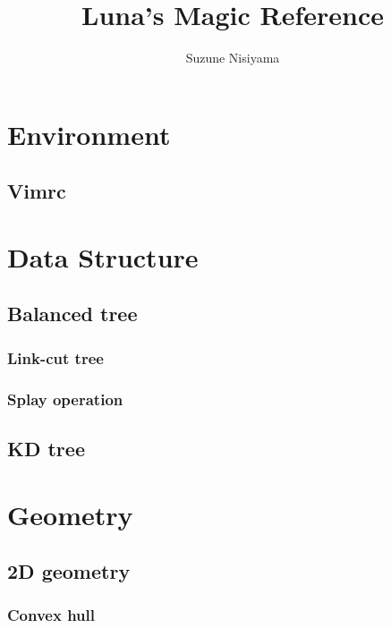 \documentclass[titlepage,a4paper,10pt]{article}
\title{Luna's Magic Reference}
\author{Suzune Nisiyama}
\date{\today\\ \vspace{100pt} \noindent\rule{\textwidth}{1pt}\\ \vspace{100pt} \normalsize\begin{raggedright}\end{raggedright}}
\begin{document}
	\maketitle
	\begin{multicols}{2}
		\setcounter{tocdepth}{3}
		\begingroup
		\let\cleardoublepage\relax
		\let\clearpage\relax
		\tableofcontents
		\newpage
		\begin{spacing}{0.8}
		{\footnotesize
		\section{Environment}
			\subsection{Vimrc}
				
		\section{Data Structure}
			\subsection{Balanced tree}
				\subsubsection{Link-cut tree}
					
				\subsubsection{Splay operation}
					
			\subsection{KD tree}
				
		\section{Geometry}
			
			\subsection{2D geometry}
				
				\subsubsection{Convex hull}
					
}
\end{spacing}
\end{multicols}
\end{document}

